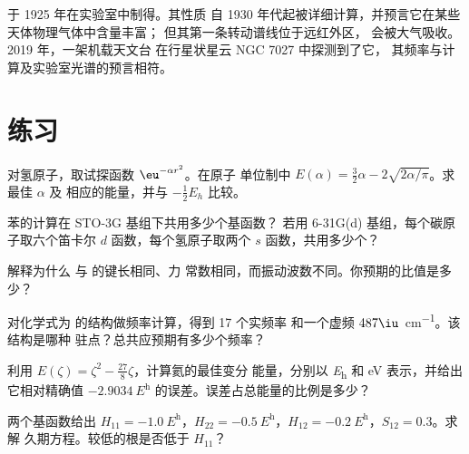 \begin{history}[一种先由计算得知的分子]
 于 1925 年在实验室中制得。其性质
自 1930 年代起被详细计算，并预言它在某些天体物理气体中含量丰富；
但其第一条转动谱线位于远红外区，
会被大气吸收。2019 年，一架机载天文台
在行星状星云 NGC 7027 中探测到了它，
其频率与计算及实验室光谱的预言相符。
\end{history}

\section{练习}

\begin{exercise}[$\star$]\label{exo:b3:computational-chemistry:1}
对氢原子，取试探函数 $\eu^{-\alpha r^2}$。在原子
单位制中 $E(\alpha) = \frac32\alpha - 2\sqrt{2\alpha/\pi}$。求最佳 $\alpha$ 及
相应的能量，并与 $-\frac12E_h$ 比较。
\end{exercise}

\begin{exercise}[$\star$]\label{exo:b3:computational-chemistry:2}
苯的计算在 STO-3G 基组下共用多少个基函数？
若用 6-31G(d) 基组，每个碳原子取六个笛卡尔 $d$ 函数，每个氢原子取两个 $s$
函数，共用多少个？
\end{exercise}

\begin{exercise}[$\star$]\label{exo:b3:computational-chemistry:3}
解释为什么  与  的键长相同、力
常数相同，而振动波数不同。你预期的比值是多少？
\end{exercise}

\begin{exercise}[$\star$]\label{exo:b3:computational-chemistry:4}
对化学式为  的结构做频率计算，得到 17 个实频率
和一个虚频 $487\iu$~\unit{cm^{-1}}。该结构是哪种
驻点？总共应预期有多少个频率？
\end{exercise}

\begin{exercise}[$\star\star$]\label{exo:b3:computational-chemistry:5}
利用 $E(\zeta) = \zeta^2 - \frac{27}{8}\zeta$，计算氦的最佳变分
能量，分别以 \unit{\hartree} 和 eV 表示，并给出它相对精确值
$\qty{-2.9034}{\hartree}$ 的误差。误差占总能量的比例是多少？
\end{exercise}

\begin{exercise}[$\star\star$]\label{exo:b3:computational-chemistry:6}
两个基函数给出 $H_{11} = \qty{-1.0}{\hartree}$，$H_{22} =
\qty{-0.5}{\hartree}$，$H_{12} = \qty{-0.2}{\hartree}$，$S_{12} = 0.3$。求解
久期方程。较低的根是否低于 $H_{11}$？
\end{exercise}

